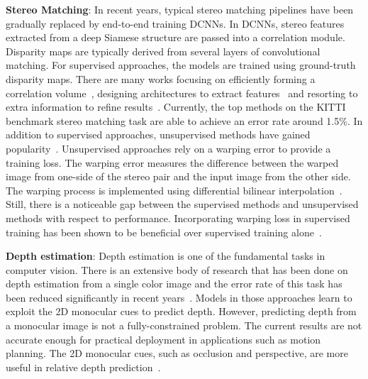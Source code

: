\documentclass[letterpaper, 10 pt, conference]{ieeeconf}
\begin{document}
    \textbf{Stereo Matching}: In recent years, typical stereo matching pipelines have been gradually replaced by end-to-end training DCNNs. In DCNNs, stereo features extracted from a deep Siamese structure are passed into a correlation module. Disparity maps are typically derived from several layers of convolutional matching. For supervised approaches, the models are trained using ground-truth disparity maps. There are many works focusing on efficiently forming a correlation volume~\cite{zbontar2016stereo,luo2016efficient,kendall}, designing architectures to extract features~\cite{PSMnet,pang2017cascade,flownet2,spatialProp} and resorting to extra information to refine results~\cite{segstereo,dissegnet}. Currently, the top methods on the KITTI benchmark stereo matching task are able to achieve an error rate around 1.5\%. In addition to supervised approaches, unsupervised methods have gained popularity~\cite{dissegnet,unsupervisedGeometry,godard2017unsupervised}. Unsupervised approaches rely on a warping error to provide a training loss. The warping error measures the difference between the warped image from one-side of the stereo pair and the input image from the other side. The warping process is implemented using differential bilinear interpolation~\cite{spatial}. Still, there is a noticeable gap between the supervised methods and unsupervised methods with respect to performance. Incorporating warping loss in supervised training has been shown to be beneficial over supervised training alone~\cite{semi-supervisedStereo}.

    \textbf{Depth estimation}: Depth estimation is one of the fundamental tasks in computer vision. There is an extensive body of research that has been done on depth estimation from a single color image and the error rate of this task has been reduced significantly in recent years~\cite{saxena2006learning,saxena20083,eigen2014depth,DeepOrdinal,li2018deep}. Models in those approaches learn to exploit the 2D monocular cues to predict depth. However, predicting depth from a monocular image is not a fully-constrained problem. The current results are not accurate enough for practical deployment in applications such as motion planning. The 2D monocular cues, such as occlusion and perspective, are more useful in relative depth prediction~\cite{xian2018monocular, chen2016single}. 
    
\end{document}
